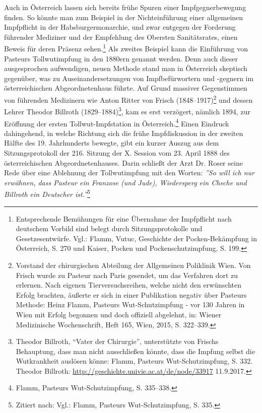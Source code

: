 \documentclass[
    a4paper,
    12pt,
    hyphens,
    chapterprefix=true,
    headheight=33pt,
    footheight=29pt,
    headings=optiontohead, %
]{scrartcl}
\begin{document}
Auch in Österreich lassen sich bereits frühe Spuren einer Impfgegnerbewegung finden. So könnte man zum Beispiel in der Nichteinführung einer allgemeinen Impfpflicht in der Habsburgermonarchie, und zwar entgegen der Forderung führender Mediziner und der Empfehlung des Obersten Sanitätsrates, einen Beweis für deren Präsenz sehen.\footnote{Entsprechende Bemühungen für eine Übernahme der Impfpflicht nach deutschem Vorbild sind belegt durch Sitzungsprotokolle und Gesetzesentwürfe. Vgl.: Flamm, Vutuc, Geschichte der Pocken-Bekämpfung in Österreich, S. 270 und Kaiser, Pocken und Pockenschutzimpfung, S. 199.} Als zweites Beispiel kann die Einführung von Pasteurs Tollwutimpfung in den 1880ern genannt werden. Denn auch dieser ausgesprochen aufwendigen, neuen Methode stand man in Österreich skeptisch gegenüber, was zu Auseinandersetzungen von Impfbefürwortern und -gegnern im österreichischen Abgeordnetenhaus führte. Auf Grund massiver Gegenstimmen von führenden Medizinern wie Anton Ritter von Frisch (1848--1917)\footnote{Vorstand der chirurgischen Abteilung der Allgemeinen Poliklinik Wien. Von Frisch wurde zu Pasteur nach Paris gesendet, um das Verfahren dort zu erlernen. Nach eigenen Tierversuchsreihen, welche nicht den erwünschten Erfolg brachten, äußerte er sich in einer Publikation negativ über Pasteurs Methode: Heinz Flamm, Pasteurs Wut-Schutzimpfung - vor 130 Jahren in Wien mit Erfolg begonnen und doch offiziell abgelehnt, in: Wiener Medizinische Wochenschrift, Heft 165, Wien, 2015, S. 322--339.} und dessen Lehrer Theodor Billroth (1829--1884)\footnote{Theodor Billroth, "`Vater der Chirurgie"', unterstützte von Frischs Behauptung, dass man nicht ausschließen könnte, dass die Impfung selbst die Wutkrankheit auslösen könne: Flamm, Pasteurs Wut-Schutzimpfung, S. 332. Theodor Billroth: \url{http://geschichte.univie.ac.at/de/node/33917} 11.9.2017.}, 
kam es erst verzögert, nämlich 1894, zur Eröffnung der ersten Tollwut-Impfstation in Österreich.\footnote{Flamm, Pasteurs Wut-Schutzimpfung, S. 335--338.} Einen Eindruck dahingehend, in welche Richtung sich die frühe Impfdiskussion in der zweiten Hälfte des 19. Jahrhunderts bewegte, gibt ein kurzer Auszug aus dem Sitzungsprotokoll der 216. Sitzung der X. Session vom 23. April 1888 des österreichischen Abgeordnetenhauses. Darin schließt der Arzt Dr. Roser seine Rede über eine Ablehnung der Tollwutimpfung mit den Worten: \textit{''So will ich nur erwähnen, dass Pasteur ein Franzose (und Jude), Wiedersperg ein Cheche und Billroth ein Deutscher ist.''}\footnote{Zitiert nach: Vgl.: Flamm, Pasteurs Wut-Schutzimpfung, S. 335.}\\
\end{document}
